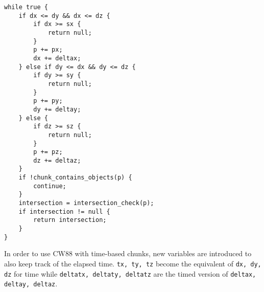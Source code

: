 \begin{verbatim}
while true {
	if dx <= dy && dx <= dz {
		if dx >= sx {
            return null;
        }
		p += px;
		dx += deltax;
	} else if dy <= dx && dy <= dz {
		if dy >= sy {
            return null;
        }
		p += py;
		dy += deltay;
	} else {
		if dz >= sz {
            return null;
        }
		p += pz;
		dz += deltaz;
	}
    if !chunk_contains_objects(p) {
        continue;
    }
    intersection = intersection_check(p);
    if intersection != null {
        return intersection;
    }
}
\end{verbatim}

In order to use CW88 with time-based chunks,
new variables are introduced to also keep track of the elapsed time.
\verb|tx, ty, tz| become the equivalent of \verb|dx, dy, dz| for time
while \verb|deltatx, deltaty, deltatz| are the timed version of \verb|deltax, deltay, deltaz|.